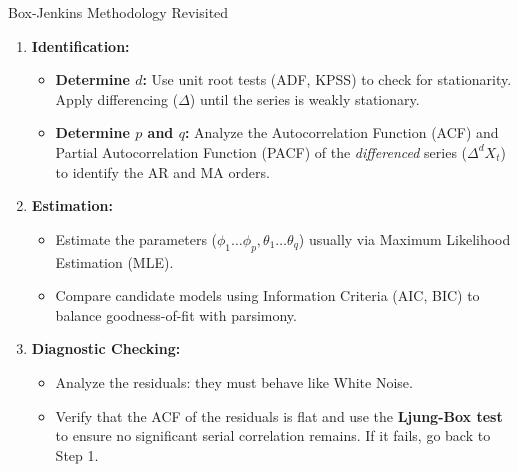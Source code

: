 \documentclass[aspectratio=169]{beamer}
\begin{document}
\begin{frame}{Box-Jenkins Methodology Revisited}
\begin{enumerate}
    \item \textbf{Identification:} 
    \begin{itemize}
        \item \textbf{Determine $d$:} Use unit root tests (ADF, KPSS) to check for stationarity. Apply differencing ($\Delta$) until the series is weakly stationary.
        \item \textbf{Determine $p$ and $q$:} Analyze the Autocorrelation Function (ACF) and Partial Autocorrelation Function (PACF) of the \textit{differenced} series ($\Delta^d X_t$) to identify the AR and MA orders.
    \end{itemize}
    
    \vspace{0.3cm}
    
    \item \textbf{Estimation:} 
    \begin{itemize}
        \item Estimate the parameters ($\phi_1 \dots \phi_p, \theta_1 \dots \theta_q$) usually via Maximum Likelihood Estimation (MLE).
        \item Compare candidate models using Information Criteria (AIC, BIC) to balance goodness-of-fit with parsimony.
    \end{itemize}
    
    \vspace{0.3cm}
    
    \item \textbf{Diagnostic Checking:} 
    \begin{itemize}
        \item Analyze the residuals: they must behave like White Noise.
        \item Verify that the ACF of the residuals is flat and use the \textbf{Ljung-Box test} to ensure no significant serial correlation remains. If it fails, go back to Step 1.
    \end{itemize}
\end{enumerate}
\end{frame}
\end{document}
